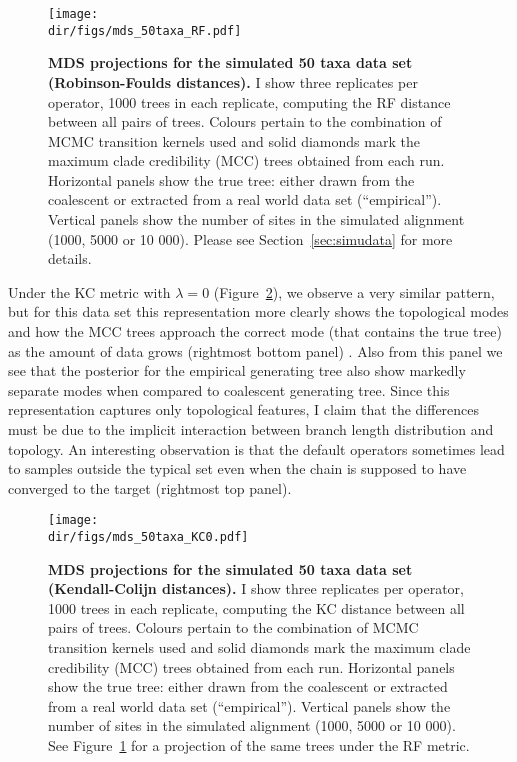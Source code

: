 \begin{figure}[!ht]
\begin{center}
\texttt{[image: \\dir/figs/mds\_50taxa\_RF.pdf]} 
\end{center}
 \caption[MDS projections for the simulated 50 taxa data set (Robinson-Foulds distances).]{\textbf{MDS projections for the simulated 50 taxa data set (Robinson-Foulds distances).}
  I show three replicates per operator, 1000 trees in each replicate, computing the RF distance between all pairs of trees.
 Colours pertain to the combination of MCMC transition kernels used and solid diamonds mark the maximum clade credibility (MCC) trees obtained from each run.
 Horizontal panels show the true tree: either drawn from the coalescent or extracted from a real world data set (``empirical'').
 Vertical panels show the number of sites in the simulated alignment (1000, 5000 or 10 000).
 Please see Section~\ref{sec:simudata} for more details.
 }
 \label{fig:mds_50taxa_RF}
\end{figure}

Under the KC metric with $\lambda = 0$ (Figure~\ref{fig:mds_50taxa_KC0}), we observe a very similar pattern, but for this data set this representation more clearly shows the topological modes and how the MCC trees approach the correct mode (that contains the true tree) as the amount of data grows (rightmost bottom panel) .
Also from this panel we see that the posterior for the empirical generating tree also show markedly separate modes when compared to coalescent generating tree.
Since this representation captures only topological features, I claim that the differences must be due to the implicit interaction between branch length distribution and topology. 
An interesting observation is that the default operators sometimes lead to samples outside the typical set even when the chain is supposed to have converged to the target (rightmost top panel).
\begin{figure}[!ht]
\begin{center}
\texttt{[image: \\dir/figs/mds\_50taxa\_KC0.pdf]} 
\end{center}
 \caption[MDS projections for the simulated 50 taxa data set (Kendall-Colijn distances).]{\textbf{MDS projections for the simulated 50 taxa data set (Kendall-Colijn distances).}
  I show three replicates per operator, 1000 trees in each replicate, computing the KC distance between all pairs of trees.
 Colours pertain to the combination of MCMC transition kernels used and solid diamonds mark the maximum clade credibility (MCC) trees obtained from each run.
 Horizontal panels show the true tree: either drawn from the coalescent or extracted from a real world data set (``empirical'').
 Vertical panels show the number of sites in the simulated alignment (1000, 5000 or 10 000).
 See Figure~\ref{fig:mds_50taxa_RF} for a projection of the same trees under the RF metric.
 }
\label{fig:mds_50taxa_KC0}
\end{figure}

